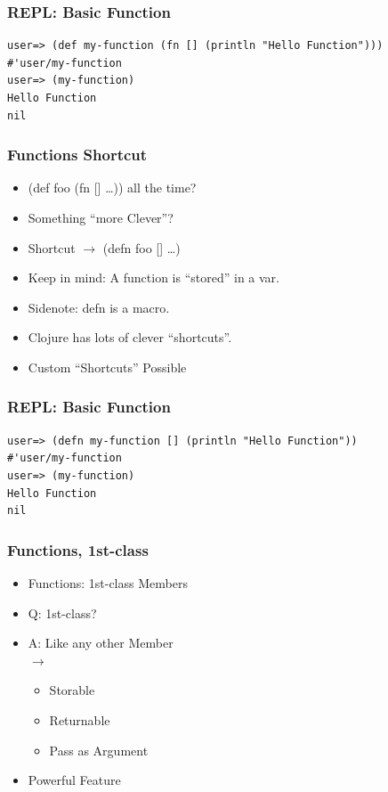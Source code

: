 \documentclass{beamer}
\begin{document}
\begin{frame}[fragile]
\frametitle{REPL: Basic Function}
\begin{lstlisting}[basicstyle=\scriptsize]
user=> (def my-function (fn [] (println "Hello Function")))
#'user/my-function
user=> (my-function)
Hello Function
nil
\end{lstlisting}
\end{frame}

  \begin{frame}
      \frametitle{Functions Shortcut}

      \begin{itemize}
          \item (def foo (fn [] \ldots)) all the time?
          \item Something ``more Clever''?
          \item Shortcut $\rightarrow$ (defn foo [] \ldots)
          \item Keep in mind: A function is ``stored'' in a var.
          \item Sidenote: defn is a macro.
          \item Clojure has lots of clever ``shortcuts''.
          \item Custom ``Shortcuts'' Possible %
      \end{itemize}
  \end{frame}

\begin{frame}[fragile]
\frametitle{REPL: Basic Function}
\begin{lstlisting}[basicstyle=\scriptsize]
user=> (defn my-function [] (println "Hello Function"))
#'user/my-function
user=> (my-function)
Hello Function
nil
\end{lstlisting}
\end{frame}

  \begin{frame}
      \frametitle{Functions, 1st-class}

      \begin{itemize}
          \item Functions: 1st-class Members 
          \item Q: 1st-class?
          \item A: Like any other Member\\$\rightarrow$
              \begin{itemize}
                  \item Storable
                  \item Returnable
                  \item Pass as Argument
              \end{itemize}
          \item Powerful Feature
      \end{itemize}
  \end{frame}
\end{document}
